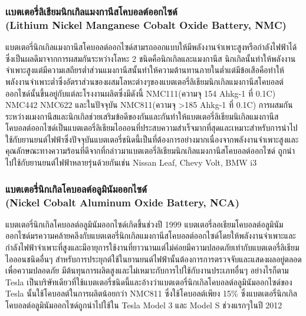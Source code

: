 \subsubsection*{เเบตเตอรี่ลิเธียมนิกเกิลแมงกานีสโคบอลต์ออกไซด์\\ (Lithium Nickel Manganese Cobalt Oxide Battery, NMC)}
	แบตเตอรี่นิกเกิลแมงกานีสโคบอลต์ออกไซด์สามรถออกแบบให้มีพลังงานจำเพาะสูงหรือกำลังไฟฟ้าได้ซึ่งเป็นผลดีมาจากการผสมกันระหว่างโลหะ 2 ชนิดคือนิกเกิลและแมงกานีส นิกเกิลนั้นทำให้พลังงานจำเพาะสูงแต่มีความเสถียรต่ำส่วนแมงกานีสนั้นทำให้ความต้านทานภายในต่ำแต่มีข้อเสีอคือทำให้พลังงานจำเพาะต่ำซึ่งอัตราส่วนของผสมโลหะต่างๆของแบตเตอรี่ลิเธียมนิกเกิลแมงกานีสโคบอลต์ออกไซด์นั้นขึ้นอยู่กับแต่ละโรงงานผลิตซึ่งมีดังนี้ NMC111(ความจุ 154 Ahkg-1 ที่ 0.1C) NMC442 NMC622 และในปัจจุบัน NMC811(ความจุ >185 Ahkg-1 ที่ 0.1C)	
	\newline การผสมกันระหว่างแมงกานีสและนิกเกิลช่วยเสริมข้อดีของกันและกันทำให้แบตเตอรี่ลิเธียมนิเกิลแมงกานีสโคบอลต์ออกไซด์เป็นแบตเตอรี่ลิเธียมไอออนที่ประสบความสำเร็จมากที่สุดและเหมาะสำหรับการนำไป
	ใช้กับยานยนต์ไฟฟ้าซึ่งปัจจุบันแบตเตอรี่ชนิดนี้เป็นที่ต้องการอย่างมากเนื่องจากพลังงานจำเพาะสูงและคุณลักษณะทางความร้อนที่ดีจากที่กล่าวมาแบตเตอรี่ลิเธียมนิกเกิลแมงกานีสโคบอลต์ออกไซด์
	ถูกนำไปใช้กับยานยนต์ไฟฟ้าหลายรุ่นด้วยกันเช่น Nissan Leaf, Chevy Volt, BMW i3
\subsubsection*{แบตเตอรี่นิกเกิลโคบอลต์อลูมินัมออกไซด์์\\ (Nickel Cobalt Aluminum Oxide Battery, NCA)}
	แบตเตอรี่นิกเกิลโคบอลต์อลูมินัมออกไซด์เกิดขึ้นช่วงปี 1999 แบตเตอรี่ลอเธียมโคบอลต์อลูมินัมออกไซด์มรความคล้ายคลึงกับแบตเตอรี่นิกเกิลแมงกานีสโคบอลต์ออกไซด์โดยให้พลังงานจำเพาะและกำลังไฟฟ้าจำเพาะที่สูงและมีอายุการใช้งานที่ยาวนานแต่ไม่ค่อยมีความปลอดภัยเท่ากับแบตเตอรี่ลิเธียมไอออนชนิดอื่นๆ สำหรับการประยุกต์ใช้ในยานยนต์ไฟฟ้านั้นต้องการการตรวจจับและแสดงผลอยู่ตลอดเพื่อความปลอดภัย มีต้นทุนการผลิตสูงและไม่เหมาะกับการไปใช้กับงานประเภทอื่นๆ
 \newline	อย่างไรก็ตาม Tesla เป็นบริษัทเดียวที่ใช้แบตเตอรี่ชนิดนี้และอ้างว่าแบตเตอรี่นิกเกิลโคบอลต์อลูมินัมออกไซด์ของ Tesla นั้นใช้โคบอลต์ในการผลิตน้อยกว่า NMC811 ซึ่งใช้โคบอลต์เพียง 15\% ซึ่งแบตเตอรี่นิกเกิลโคบอลต์อลูมินัมออกไซด์ถูกนำไปใช้ใน Tesla Model 3 และ Model S ช่วงแรกๆในปี 2012
